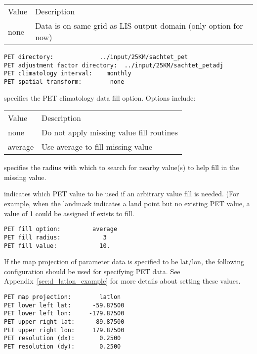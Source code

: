  \begin{tabular}{ll}
 Value   & Description                                   \\
 none    & Data is on same grid as LIS output domain (only option for now) \\
 \end{tabular}
 

 \begin{Verbatim}[frame=single]
PET directory:             ../input/25KM/sachtet_pet
PET adjustment factor directory:  ../input/25KM/sachtet_petadj
PET climatology interval:    monthly
PET spatial transform:        none
 \end{Verbatim}

 
  specifies the PET climatology
 data fill option.  Options include:

 \begin{tabular}{ll}
 Value   & Description                              \\
 none    & Do not apply missing value fill routines \\
 average & Use average to fill missing value        \\
 \end{tabular}

  specifies the radius with which
 to search for nearby value(s) to help fill in the missing value.

  indicates which  PET
 value to be used if an arbitrary value fill is needed. 
 (For example, when the landmask indicates a land point but no existing 
 PET value, a value of 1 could be assigned if exists to fill.
 \nextpar
 

 \begin{Verbatim}[frame=single]
PET fill option:         average
PET fill radius:            3
PET fill value:            10.
 \end{Verbatim}

 
 If the map projection of parameter data is specified to be lat/lon, 
 the following configuration should be used for specifying PET data.
 See Appendix~\ref{sec:d_latlon_example} for more details about
 setting these values.
 

 \begin{Verbatim}[frame=single]
PET map projection:        latlon
PET lower left lat:      -59.87500
PET lower left lon:     -179.87500
PET upper right lat:      89.87500
PET upper right lon:     179.87500
PET resolution (dx):       0.2500
PET resolution (dy):       0.2500
 \end{Verbatim}

